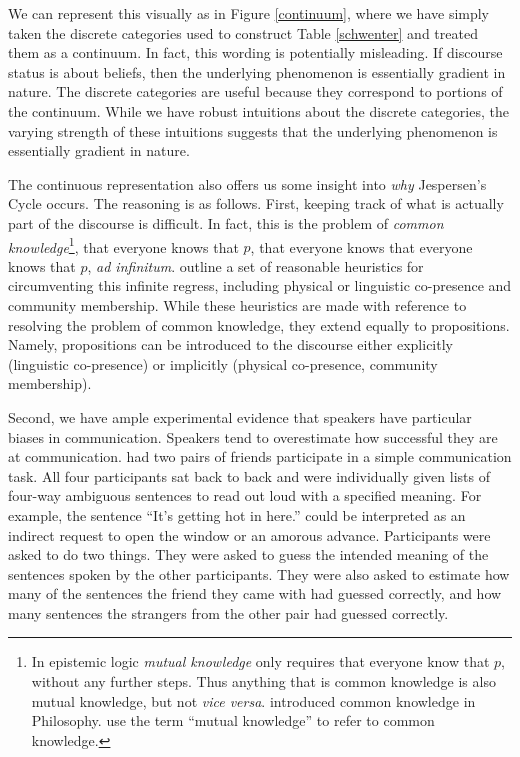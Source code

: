 \documentclass[12pt]{upenndiss}
\theoremstyle{definition} \newtheorem{definition}{Definition}
\begin{document}
We can represent this visually as in Figure \ref{continuum}, where we have simply taken the discrete categories used to construct Table \ref{schwenter} and treated them as a continuum. In fact, this wording is potentially misleading. If discourse status is about beliefs, then the underlying phenomenon is essentially gradient in nature. The discrete categories are useful because they correspond to portions of the continuum. While we have robust intuitions about the discrete categories, the varying strength of these intuitions suggests that the underlying phenomenon is essentially gradient in nature.

The continuous representation also offers us some insight into \emph{why} Jespersen's Cycle occurs. The reasoning is as follows. First, keeping track of what is actually part of the discourse is difficult. In fact, this is the problem of \emph{common knowledge}\footnote{In epistemic logic \emph{mutual knowledge} only requires that everyone know that $p$, without any further steps. Thus anything that is common knowledge is also mutual knowledge, but not \emph{vice versa}. \cite{lewis:1969} introduced common knowledge in Philosophy. \cite{clark-marshall1981} use the term ``mutual knowledge'' to refer to common knowledge.}, that everyone knows that $p$, that everyone knows that everyone knows that $p$, \emph{ad infinitum}. \cite{clark-marshall1981} outline a set of reasonable heuristics for circumventing this infinite regress, including physical or linguistic co-presence and community membership. While these heuristics are made with reference to resolving the problem of common knowledge, they extend equally to 
propositions. Namely, propositions can be introduced to the discourse either explicitly (linguistic co-presence) or implicitly (physical co-presence, community membership).

Second, we have ample experimental evidence that speakers have particular biases in communication. Speakers tend to overestimate how successful they are at communication. \cite{savitsky-etal:2011} had two pairs of friends participate in a simple communication task. All four participants sat back to back and were individually given lists of four-way ambiguous sentences to read out loud with a specified meaning. For example, the sentence ``It's getting hot in here.'' could be interpreted as an indirect request to open the window or an amorous advance. Participants were asked to do two things. They were asked to guess the intended meaning of the sentences spoken by the other participants. They were also asked to estimate how many of the sentences the friend they came with had guessed correctly, and how many sentences the strangers from the other pair had guessed correctly. 
\end{document}
